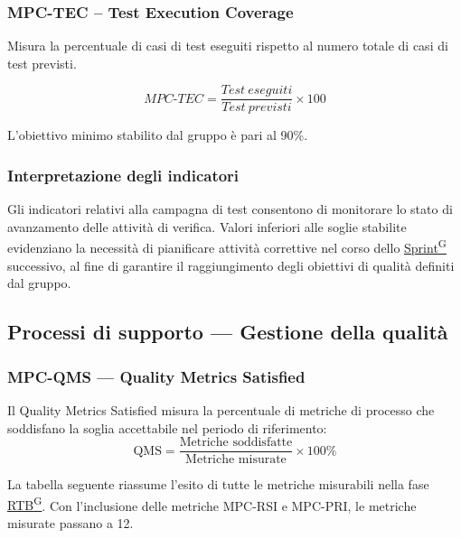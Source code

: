 \documentclass[a4paper,12pt]{article}
\providecommand{\glslink}[2]{\href{https://alittlebyte-19.github.io/Documentazione/glossario.html\#gls-#1}{\underline{#2}\textsuperscript{\scriptsize G}}}
\begin{document}
\subsubsection{MPC-TEC -- Test Execution Coverage}

Misura la percentuale di casi di test eseguiti rispetto al numero totale di casi di test previsti.

\[
MPC\text{-}TEC = \frac{Test\ eseguiti}{Test\ previsti} \times 100
\]

L'obiettivo minimo stabilito dal gruppo è pari al 90\%.

\subsubsection{Interpretazione degli indicatori}

Gli indicatori relativi alla campagna di test consentono di monitorare lo stato di avanzamento delle attività di verifica. Valori inferiori alle soglie stabilite evidenziano la necessità di pianificare attività correttive nel corso dello \glslink{sprint}{Sprint} successivo, al fine di garantire il raggiungimento degli obiettivi di qualità definiti dal gruppo.

\subsection{Processi di supporto — Gestione della qualità}

\subsubsection{MPC-QMS — Quality Metrics Satisfied}

Il Quality Metrics Satisfied misura la percentuale di metriche di processo che soddisfano la soglia accettabile nel periodo di riferimento:
\[
  \text{QMS} = \frac{\text{Metriche soddisfatte}}{\text{Metriche misurate}} \times 100\%
\]

La tabella seguente riassume l'esito di tutte le metriche misurabili nella fase \glslink{rtb-requirements-and-technology-baseline}{RTB}. Con l'inclusione delle metriche MPC-RSI e MPC-PRI, le metriche misurate passano a 12.
\end{document}
